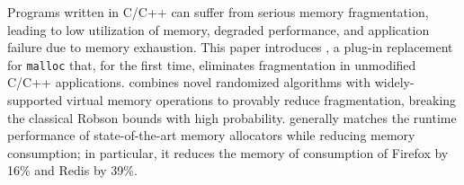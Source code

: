 
Programs written in C/C++ can suffer from serious memory
fragmentation, leading to low utilization of memory, degraded
performance, and application failure due to memory exhaustion. This
paper introduces \Mesh, a plug-in replacement for \texttt{malloc}
that, for the first time, eliminates fragmentation in unmodified
C/C++ applications. \Mesh combines novel randomized algorithms with
widely-supported virtual memory operations to provably reduce
fragmentation, breaking the classical Robson bounds with high
probability. \Mesh generally matches the runtime performance of
state-of-the-art memory allocators while reducing memory consumption;
in particular, it reduces the memory of consumption of Firefox by 16\%
and Redis by 39\%.

